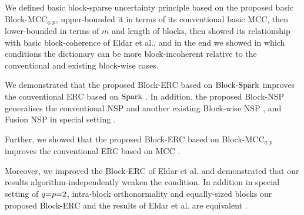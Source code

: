 We defined basic block-sparse uncertainty principle based on the proposed basic Block-MCC$_{q,p}$, 
upper-bounded it in terms of its conventional basic MCC, 
then lower-bounded in terms of $m$ and length of blocks, 
then showed its relationship with basic block-coherence of Eldar et al., 
and in the end we showed in which conditions the dictionary can be more block-incoherent relative to the conventional and existing block-wise cases.

We demonstrated that the proposed Block-ERC based on $\mathrm{Block\text{{-}}Spark}$ 
improves the conventional ERC based on $\mathrm{Spark}$ \cite{Donoho2003,Gribonval2003a}.
In addition, the proposed Block-NSP 
generalises the conventional NSP \cite{Donoho2001,Elad2001,Gribonval2003a,Feuer2003,Zhang2005a,Stojnic2008,Cohen2009}
and another existing Block-wise NSP \cite{Stojnic2009a}, and Fusion NSP in special setting \cite{Boufounos2011}.

Further, %
we showed that the proposed Block-ERC based on Block-MCC$_{q,p}$ 
improves the conventional ERC based on MCC \cite{Donoho2001}.

Moreover, we improved the Block-ERC of Eldar et al. and demonstrated that our results algorithm-independently weaken the condition.
In addition in special setting of $q {=} p {=} 2$, intra-block orthonormality and equally-sized blocks our proposed Block-ERC and the results of Eldar et al. are equivalent \cite{Eldar2009b}.

